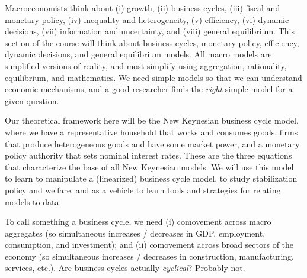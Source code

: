 \documentclass[10pt]{article}
\begin{document}
Macroeconomists think about (i) growth, (ii) business cycles, (iii) fiscal and monetary policy, (iv) inequality and heterogeneity, (v) efficiency, (vi) dynamic decisions, (vii) information and uncertainty, and (viii) general equilibrium. This section of the course will think about business cycles, monetary policy, efficiency, dynamic decisions, and general equilibrium models. All macro models are simplified versions of reality, and most simplify using aggregation, rationality, equilibrium, and mathematics. We need simple models so that we can understand economic mechanisms, and a good researcher finds the \emph{right} simple model for a given question.

Our theoretical framework here will be the New Keynesian business cycle model, where we have a representative household that works and consumes goods, firms that produce heterogeneous goods and have some market power, and a monetary policy authority that sets nominal interest rates. These are the three equations that characterize the base of all New Keynesian models. We will use this model to learn to manipulate a (linearized) business cycle model, to study stabilization policy and welfare, and as a vehicle to learn tools and strategies for relating models to data.

To call something a business cycle, we need (i) comovement across macro aggregates (so simultaneous increases / decreases in GDP, employment, consumption, and investment); and (ii) comovement across broad sectors of the economy (so simultaneous increases / decreases in construction, manufacturing, services, etc.). Are business cycles actually \emph{cyclical}? Probably not.
\end{document}
